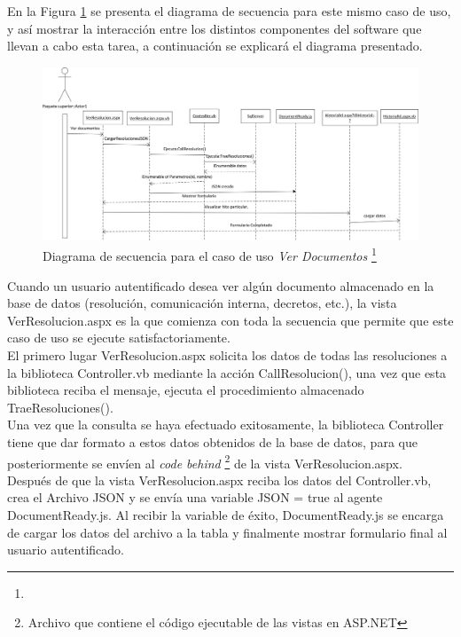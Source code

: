 	
	
			En la Figura \ref{diagrama_secuencial_ver_documento} se presenta el diagrama de secuencia para este mismo caso de uso, y así mostrar la interacción entre los distintos componentes del software que llevan a cabo esta tarea, a continuación se explicará el diagrama presentado.
			\begin{figure}[H]
				\centering
				\includegraphics[width=1\textwidth]{images/Capitulo_3/ver_Documentos.png}
				\caption[Diagrama de secuencia para el caso de uso \textit{Ver Documentos}]{Diagrama de secuencia para el caso de uso \textit{Ver Documentos} \footnote{}}
				\label{diagrama_secuencial_ver_documento}
			\end{figure}
			

	Cuando un usuario autentificado desea ver algún documento almacenado en la base de datos (resolución, comunicación interna, decretos, etc.), la vista VerResolucion.aspx es la que comienza con toda la secuencia que permite que este caso de uso se ejecute satisfactoriamente.
	\\
	
	El primero lugar VerResolucion.aspx solicita los datos de todas las resoluciones a la biblioteca Controller.vb mediante la acción CallResolucion(), una vez que esta biblioteca reciba el mensaje, ejecuta el procedimiento almacenado TraeResoluciones().
	\\
	
	Una vez que la consulta se haya efectuado exitosamente, la biblioteca Controller tiene que dar formato a estos  datos obtenidos de la base de datos, para que posteriormente se envíen al \textit{code behind} \footnote{Archivo que contiene el código ejecutable de las vistas en ASP.NET} de la vista VerResolucion.aspx.
	\\
	
	Después de que la vista VerResolucion.aspx reciba los datos del Controller.vb, crea el Archivo JSON y se envía una variable JSON = true al agente DocumentReady.js. Al recibir la variable de éxito, DocumentReady.js se encarga de cargar los datos del archivo a la tabla y finalmente mostrar formulario final al usuario autentificado.





